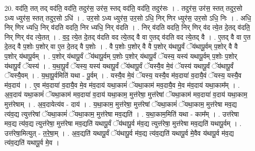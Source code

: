 \documentclass[17pt]{extarticle}
\begin{document}
20. वद॑ति॒ तत् तद् वद॑ति॒ वद॑ति॒ तदुर॑स॒ उर॑स॒ स्तद् वद॑ति॒ वद॑ति॒ तदुर॑सः । . तदुर॑स॒ उर॑स॒ स्तत् तदुर॒सो ऽध्य ध्युर॑स॒ स्तत् तदुर॒सो ऽधि॑ । . उर॒सो ऽध्य ध्युर॑स॒ उर॒सो ऽधि॒ निर् णिर ध्युर॑स॒ उर॒सो ऽधि॒ निः । . अधि॒ निर् णिर ध्यधि॒ निर् व॑दति वदति॒ निर ध्यधि॒ निर् व॑दति । . निर् व॑दति वदति॒ निर् णिर् व॑द त्ये॒त दे॒तद् व॑दति॒ निर् णिर् व॑द त्ये॒तत् । . व॒द॒ त्ये॒त दे॒तद् व॑दति वद त्ये॒तद् वै वा ए॒तद् व॑दति वद त्ये॒तद् वै । . ए॒तद् वै वा ए॒त दे॒तद् वै प॒शोः प॒शोर् वा ए॒त दे॒तद् वै प॒शोः । . वै प॒शोः प॒शोर् वै वै प॒शोर् य॑थापू॒र्वं ॅय॑थापू॒र्वम् प॒शोर् वै वै प॒शोर् य॑थापू॒र्वम् । . प॒शोर् य॑थापू॒र्वं ॅय॑थापू॒र्वम् प॒शोः प॒शोर् य॑थापू॒र्वं ॅयस्य॒ यस्य॑ यथापू॒र्वम् प॒शोः प॒शोर् य॑थापू॒र्वं ॅयस्य॑ । . य॒था॒पू॒र्वं ॅयस्य॒ यस्य॑ यथापू॒र्वं ॅय॑थापू॒र्वं ॅयस्यै॒व मे॒वं ॅयस्य॑ यथापू॒र्वं ॅय॑थापू॒र्वं ॅयस्यै॒वम् । . य॒था॒पू॒र्वमिति॑ यथा - पू॒र्वम् । . यस्यै॒व मे॒वं ॅयस्य॒ यस्यै॒व म॑व॒दाया॑ व॒दायै॒वं ॅयस्य॒ यस्यै॒व म॑व॒दाय॑ । . ए॒व म॑व॒दाया॑ व॒दायै॒व मे॒व म॑व॒दाय॑ यथा॒कामं॑ ॅयथा॒काम॑ मव॒दायै॒व मे॒व म॑व॒दाय॑ यथा॒काम᳚म् । . अ॒व॒दाय॑ यथा॒कामं॑ ॅयथा॒काम॑ मव॒दाया॑ व॒दाय॑ यथा॒काम॒ मुत्त॑रेषा॒ मुत्त॑रेषां ॅयथा॒काम॑ मव॒दाया॑ व॒दाय॑ यथा॒काम॒ मुत्त॑रेषाम् । . अ॒व॒दायेत्य॑व - दाय॑ । . य॒था॒काम॒ मुत्त॑रेषा॒ मुत्त॑रेषां ॅयथा॒कामं॑ ॅयथा॒काम॒ मुत्त॑रेषा मव॒द्य त्य॑व॒द्य त्युत्त॑रेषां ॅयथा॒कामं॑ ॅयथा॒काम॒ मुत्त॑रेषा मव॒द्यति॑ । . य॒था॒काम॒मिति॑ यथा - काम᳚म् । . उत्त॑रेषा मव॒द्य त्य॑व॒द्य त्युत्त॑रेषा॒ मुत्त॑रेषा मव॒द्यति॑ यथापू॒र्वं ॅय॑थापू॒र्व म॑व॒द्य त्युत्त॑रेषा॒ मुत्त॑रेषा मव॒द्यति॑ यथापू॒र्वम् । . उत्त॑रेषा॒मित्युत् - त॒रे॒षा॒म् । . अ॒व॒द्यति॑ यथापू॒र्वं ॅय॑थापू॒र्व म॑व॒द्य त्य॑व॒द्यति॑ यथापू॒र्व मे॒वैव य॑थापू॒र्व म॑व॒द्य त्य॑व॒द्यति॑ यथापू॒र्व मे॒व । \newline
\end{document}
